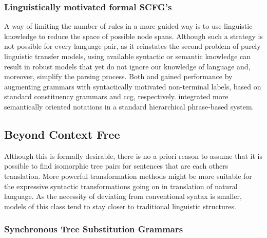 \documentclass[a4paper, 11pt]{report}
\theoremstyle{definition}
\theoremstyle{plain}
\begin{document}

\subsubsection{Linguistically motivated formal SCFG's}

A way of limiting the number of rules in a more guided way is to use linguistic knowledge to reduce the space of possible node spans. Although such a strategy is not possible for every language pair, as it reinstates the second problem of purely linguistic transfer models, using available syntactic or semantic knowledge can result in robust models that yet do not ignore our knowledge of language and, moreover, simplify the parsing process. Both \cite{zollmann2006syntax} and \cite{almaghout2010ccg} gained performance by augmenting grammars with syntactically motivated non-terminal labels, based on standard constituency grammars and ccg, respectively. \cite{li2013modeling} integrated more semantically oriented notations in a standard hierarchical phrase-based system.


\subsection{Beyond Context Free}

Although this is formally desirable, there is no a priori reason to assume that it is possible to find isomorphic tree pairs for sentences that are each others translation. More powerful transformation methods might be more suitable for the expressive syntactic transformations going on in translation of natural language. As the necessity of deviating from conventional syntax is smaller, models of this class tend to stay closer to traditional linguistic structures.

\subsubsection{Synchronous Tree Substitution Grammars}
\end{document}
